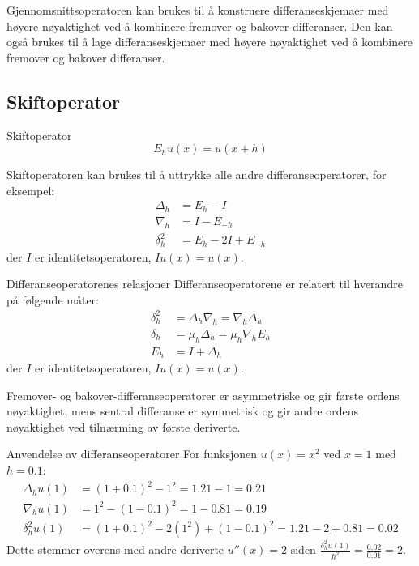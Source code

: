 \begin{remark*}{}{}
	Gjennomsnittsoperatoren kan brukes til å konstruere differanseskjemaer med høyere nøyaktighet ved å kombinere fremover og bakover differanser.
	Den kan også brukes til å lage differanseskjemaer med høyere nøyaktighet ved å kombinere fremover og bakover differanser.
\end{remark*}

\subsection{Skiftoperator}
\begin{definition}{Skiftoperator}{}
	\begin{equation}
		E_h u(x) = u(x + h) \label{eq:shift_op}
	\end{equation}
\end{definition}

\begin{remark*}{}{}
	Skiftoperatoren kan brukes til å uttrykke alle andre differanseoperatorer, for eksempel:
	\begin{align}
		\Delta_h   & = E_h - I           \\
		\nabla_h   & = I - E_{-h}        \\
		\delta_h^2 & = E_h - 2I + E_{-h}
	\end{align}
	der $I$ er identitetsoperatoren, $Iu(x) = u(x)$.
\end{remark*}

\begin{theorem}{Differanseoperatorenes relasjoner}{}
	Differanseoperatorene er relatert til hverandre på følgende måter:
	\begin{align}
		\delta_h^2 & = \Delta_h \nabla_h = \nabla_h \Delta_h \\
		\delta_h   & = \mu_h \Delta_h = \mu_h \nabla_h E_h   \\
		E_h        & = I + \Delta_h
	\end{align}
	der $I$ er identitetsoperatoren, $Iu(x) = u(x)$.
\end{theorem}

\begin{remark*}{}{}
	Fremover- og bakover-differanseoperatorer er asymmetriske og gir første ordens nøyaktighet,
	mens sentral differanse er symmetrisk og gir andre ordens nøyaktighet ved tilnærming av første deriverte.
\end{remark*}

\begin{example}{Anvendelse av differanseoperatorer}{}
	For funksjonen $u(x) = x^2$ ved $x=1$ med $h=0.1$:
	\begin{align*}
		\Delta_h u(1)   & = (1+0.1)^2 - 1^2 = 1.21 - 1 = 0.21                       \\
		\nabla_h u(1)   & = 1^2 - (1-0.1)^2 = 1 - 0.81 = 0.19                       \\
		\delta_h^2 u(1) & = (1+0.1)^2 - 2(1^2) + (1-0.1)^2 = 1.21 - 2 + 0.81 = 0.02
	\end{align*}
	Dette stemmer overens med andre deriverte $u''(x) = 2$ siden $\frac{\delta_h^2 u(1)}{h^2} = \frac{0.02}{0.01} = 2$.
\end{example}

